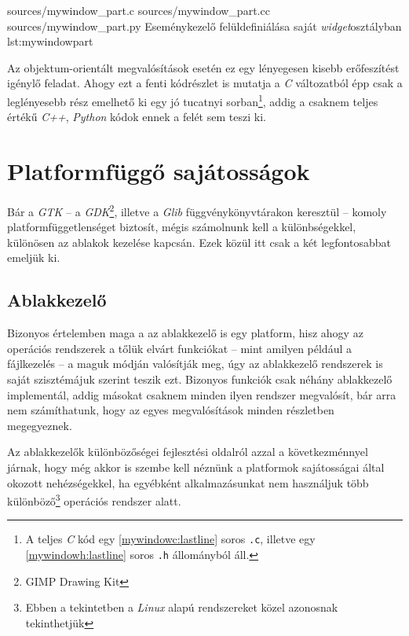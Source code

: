 \lsttriplesource
{sources/mywindow_part.c}
{sources/mywindow_part.cc}
{sources/mywindow_part.py}
{Eseménykezelő felüldefiniálása saját \textit{widget}osztályban}
{lst:mywindowpart}

Az objektum-orientált megvalósítások esetén ez egy lényegesen kisebb erőfeszítést igénylő feladat. Ahogy ezt a fenti kódrészlet is mutatja a \textit{C} változatból épp csak a leglényesebb rész emelhető ki egy jó tucatnyi sorban\footnote{A teljes \textit{C} kód egy \ref{mywindowc:lastline} soros \texttt{.c}, illetve egy \ref{mywindowh:lastline} soros \texttt{.h} állományból áll.}, addig a csaknem teljes értékű \textit{C++}, \textit{Python} kódok ennek a felét sem teszi ki.

\section{Platformfüggő sajátosságok}

Bár a \textit{GTK} -- a \textit{GDK}\footnote{GIMP Drawing Kit}, illetve a \textit{Glib} függvénykönyvtárakon keresztül -- komoly platformfüggetlenséget biztosít, mégis számolnunk kell a különbségekkel, különösen az ablakok kezelése kapcsán. Ezek közül itt csak a két legfontosabbat emeljük ki.

\subsection{Ablakkezelő}

Bizonyos értelemben maga a az ablakkezelő is egy platform, hisz ahogy az operációs rendszerek a tőlük elvárt funkciókat -- mint amilyen például a fájlkezelés -- a maguk módján valósítják meg, úgy az ablakkezelő rendszerek is saját szisztémájuk szerint teszik ezt. Bizonyos funkciók csak néhány ablakkezelő implementál, addig másokat csaknem minden ilyen rendszer megvalósít, bár arra nem számíthatunk, hogy az egyes megvalósítások minden részletben megegyeznek.

Az ablakkezelők különbözőségei fejlesztési oldalról azzal a következménnyel járnak, hogy még akkor is szembe kell néznünk a platformok sajátosságai által okozott nehézségekkel, ha egyébként alkalmazásunkat nem használjuk több különböző\footnote{Ebben a tekintetben a \textit{Linux} alapú rendszereket közel azonosnak tekinthetjük} operációs rendszer alatt.

